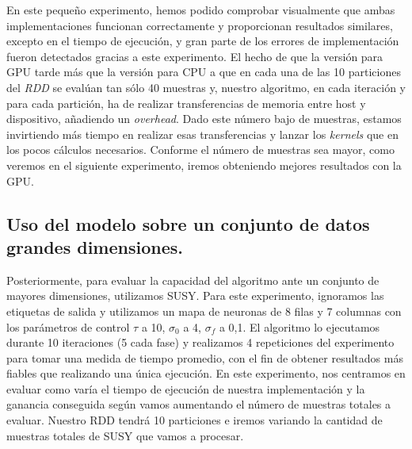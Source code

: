 En este pequeño experimento, hemos podido comprobar visualmente que ambas implementaciones funcionan correctamente y proporcionan resultados similares, excepto en el tiempo de ejecución, y gran parte de los errores de implementación fueron detectados gracias a este experimento. El hecho de que la versión para GPU tarde más que la versión para CPU a que en cada una de las 10 particiones del \textit{RDD} se evalúan tan sólo 40 muestras y, nuestro algoritmo, en cada iteración y para cada partición, ha de realizar transferencias de memoria entre host y dispositivo, añadiendo un \textit{overhead}. Dado este número bajo de muestras, estamos invirtiendo más tiempo en realizar esas transferencias y lanzar los \textit{kernels} que en los pocos cálculos necesarios. Conforme el número de muestras sea mayor, como veremos en el siguiente experimento, iremos obteniendo mejores resultados con la GPU. 

\subsection{Uso del modelo sobre un conjunto de datos grandes dimensiones.}
Posteriormente, para evaluar la capacidad del algoritmo ante un conjunto de mayores dimensiones, utilizamos SUSY. Para este experimento, ignoramos las etiquetas de salida y utilizamos un mapa de neuronas de 8 filas y 7 columnas con los parámetros de control $\tau$ a 10, $\sigma_0$ a 4, $\sigma_f$ a 0,1. El algoritmo lo ejecutamos durante 10 iteraciones (5 cada fase) y realizamos 4 repeticiones del experimento para tomar una medida de tiempo promedio, con el fin de obtener resultados más fiables que realizando una única ejecución. En este experimento, nos centramos en evaluar como varía el tiempo de ejecución de nuestra implementación y la ganancia conseguida según vamos aumentando el número de muestras totales a evaluar. Nuestro RDD tendrá 10 particiones e iremos variando la cantidad de muestras totales de SUSY que vamos a procesar.

